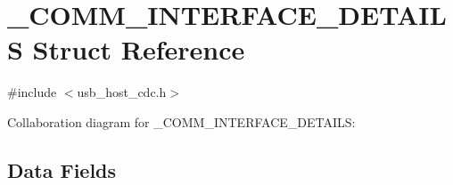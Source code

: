 \hypertarget{struct___c_o_m_m___i_n_t_e_r_f_a_c_e___d_e_t_a_i_l_s}{}\section{\+\_\+\+C\+O\+M\+M\+\_\+\+I\+N\+T\+E\+R\+F\+A\+C\+E\+\_\+\+D\+E\+T\+A\+I\+L\+S Struct Reference}
\label{struct___c_o_m_m___i_n_t_e_r_f_a_c_e___d_e_t_a_i_l_s}


{\ttfamily \#include $<$usb\+\_\+host\+\_\+cdc.\+h$>$}



Collaboration diagram for \+\_\+\+C\+O\+M\+M\+\_\+\+I\+N\+T\+E\+R\+F\+A\+C\+E\+\_\+\+D\+E\+T\+A\+I\+L\+S\+:
\subsection*{Data Fields}
